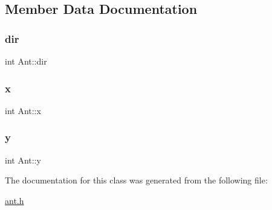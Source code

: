 \subsection{Member Data Documentation}
\mbox{\label{classAnt_a2d574125de62bc48aa408d0cbf0ef462}} 
\subsubsection{\texorpdfstring{dir}{dir}}
{\footnotesize\ttfamily int Ant\+::dir}

\mbox{\label{classAnt_a8409e55184d47e3be2324354f00d8a27}} 
\subsubsection{\texorpdfstring{x}{x}}
{\footnotesize\ttfamily int Ant\+::x}

\mbox{\label{classAnt_ac0d0527d48eb2fd1b78d10cc668ebcb4}} 
\subsubsection{\texorpdfstring{y}{y}}
{\footnotesize\ttfamily int Ant\+::y}



The documentation for this class was generated from the following file\+:\begin{DoxyCompactItemize}
\item 
\hyperlink{ant_8h}{ant.\+h}\end{DoxyCompactItemize}
